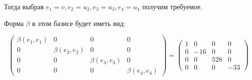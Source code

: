 \documentclass[11pt]{article}
\begin{document}
Тогда выбрав $e_1 = v, e_2 = u_2, e_3 = u_3, e_4 = u_4$ получим требуемое.

Форма $\beta$ в этом базисе будет иметь вид:

$$
\begin{pmatrix}
\beta(e_1, e_1) & 0 & 0 & 0\\
0 & \beta(e_2, e_2) & 0 & 0\\
0 & 0 & \beta(e_3, e_3) & 0\\
0 & 0 & 0 & \beta(e_4, e_4)
\end{pmatrix} = 
\begin{pmatrix}
1 & 0 & 0 & 0\\
0 & -16 & 0 & 0\\
0 & 0 & 528 & 0\\
0 & 0 & 0 & -33
\end{pmatrix}
$$
\end{document}
